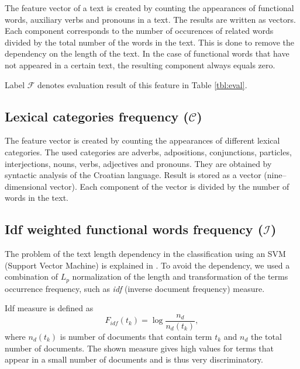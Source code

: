 \documentclass[11pt,english]{article}
\begin{document}
\begin{multicols}{2}
The feature vector of a text is created by counting the appearances
of functional words, auxiliary verbs and pronouns in a text. The results
are written as vectors. Each component corresponds to the number of occurences of
related words divided by the total number of the words in the text. This is done
to remove the dependency on the length of the text. In the case of functional words that
have not appeared in a certain text, the resulting component always equals zero.

Label $\mathcal{F}$ denotes evaluation result of this feature in Table
\ref{tbl:eval}.

\subsection{Lexical categories frequency ($\mathcal{C}$)}
\label{sec:rijeci-grupe}
The feature vector is created by counting the appearances of
different lexical categories. The used categories are adverbs,
adpositions, conjunctions, particles, interjections, nouns, verbs, adjectives and
pronouns. They are obtained by syntactic analysis of the Croatian language. Result is
stored as a vector (nine--dimensional vector). Each component of the vector
is divided by the number of words in the text.

\subsection{Idf weighted functional words frequency ($\mathcal{I}$)}
\label{sec:funkcijske-rijeci-idf}
The problem of the text length dependency in the classification using
an SVM (Support Vector Machine) is explained in \citep{diederich2003authorship}.
To avoid the dependency, we used a combination of $L_p$ normalization of the
length and transformation of the terms occurrence frequency, such as \emph{idf}
(inverse document frequency) measure.

Idf measure is defined as \citep{diederich2003authorship}
\begin{equation}
F_{idf}(t_k) = \log \frac{n_d}{n_d(t_k)},
\label{equ:idf}
\end{equation}
where $n_d(t_k)$ is number of documents that contain term $t_k$ and
$n_d$ the total number of documents. The shown measure gives high values for terms
that appear in a small number of documents and is thus very discriminatory.


\end{multicols}
\end{document}
